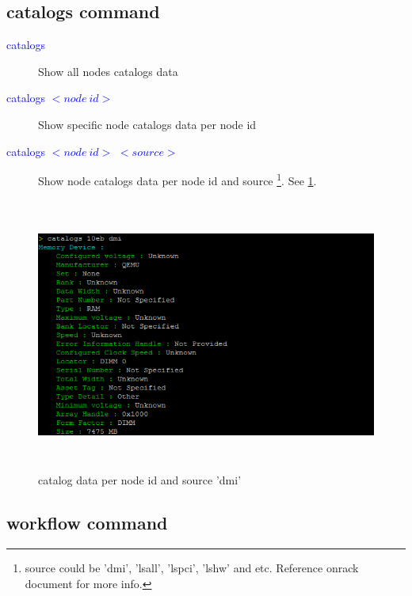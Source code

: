 \documentclass [12pt, a4paper, titlepage]{article}
\begin{document}
\subsection{catalogs command}

        \begin{description}
            \item[\textcolor{blue}{catalogs}] Show all nodes catalogs data
        \end{description}

        \begin{description}
            \item[\textcolor{blue}{catalogs $<node\ id>$}] Show specific node catalogs data per node id
        \end{description}

        \begin{description}
            \item[\textcolor{blue}{catalogs $<node\ id>$ $<source>$}] Show node catalogs data per node id and source \footnote{source could be 'dmi', 'lsall', 'lspci', 'lshw' and etc. Reference onrack document for more info.}. See \ref{catalogs}.
        \end{description}

        \begin{figure}[H]
        \begin{center}
        \includegraphics[width=13cm,height=9cm]{png/catalogs.png}
        \end{center}
        \caption{catalog data per node id and source 'dmi'}
        \label{catalogs}
        \end{figure}


\subsection{workflow command}
\end{document}
